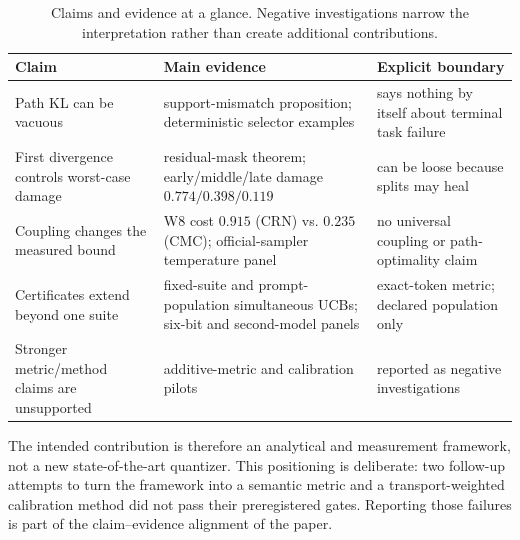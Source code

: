 \begin{table}[t]
\caption{Claims and evidence at a glance. Negative investigations narrow the interpretation rather than create additional contributions.}
\label{tab:claims}
\centering\small
\begin{tabular}{@{}p{.25\linewidth}p{.33\linewidth}p{.34\linewidth}@{}}
\toprule
Claim & Main evidence & Explicit boundary \\
\midrule
Path KL can be vacuous & support-mismatch proposition; deterministic selector examples & says nothing by itself about terminal task failure \\
First divergence controls worst-case damage & residual-mask theorem; early/middle/late damage $0.774/0.398/0.119$ & can be loose because splits may heal \\
Coupling changes the measured bound & W8 cost $0.915$ (CRN) vs. $0.235$ (CMC); official-sampler temperature panel & no universal coupling or path-optimality claim \\
Certificates extend beyond one suite & fixed-suite and prompt-population simultaneous UCBs; six-bit and second-model panels & exact-token metric; declared population only \\
Stronger metric/method claims are unsupported & additive-metric and calibration pilots & reported as negative investigations \\
\bottomrule
\end{tabular}
\end{table}

The intended contribution is therefore an analytical and measurement framework, not a new state-of-the-art quantizer. This positioning is deliberate: two follow-up attempts to turn the framework into a semantic metric and a transport-weighted calibration method did not pass their preregistered gates. Reporting those failures is part of the claim--evidence alignment of the paper.
